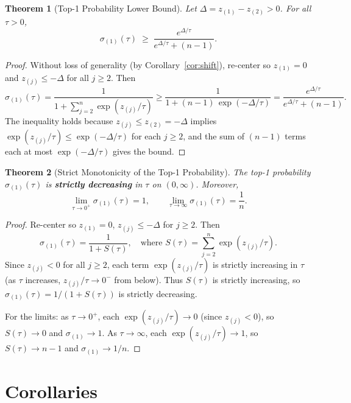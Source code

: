 \documentclass[11pt,a4paper]{article}
\newtheorem{theorem}{Theorem}
\theoremstyle{definition}
\newcommand{\softmax}{\sigma}
\newcommand{\temp}{\tau}
\newcommand{\gap}{\Delta}
\begin{document}
\begin{theorem}[Top-1 Probability Lower Bound]
\label{thm:lower}
Let $\gap = z_{(1)} - z_{(2)} > 0$. For all $\temp > 0$,
\[
  \softmax_{(1)}(\temp) \;\geq\; \frac{e^{\gap / \temp}}{e^{\gap / \temp} + (n - 1)}.
\]
\end{theorem}

\begin{proof}
Without loss of generality (by Corollary~\ref{cor:shift}), re-center so $z_{(1)} = 0$ and $z_{(j)} \leq -\gap$ for all $j \geq 2$. Then
\[
  \softmax_{(1)}(\temp) = \frac{1}{1 + \sum_{j=2}^{n} \exp(z_{(j)} / \temp)}
  \geq \frac{1}{1 + (n-1)\, \exp(-\gap / \temp)}
  = \frac{e^{\gap / \temp}}{e^{\gap / \temp} + (n - 1)}.
\]
The inequality holds because $z_{(j)} \leq z_{(2)} = -\gap$ implies $\exp(z_{(j)}/\temp) \leq \exp(-\gap/\temp)$ for each $j \geq 2$, and the sum of $(n-1)$ terms each at most $\exp(-\gap/\temp)$ gives the bound.
\end{proof}

\begin{theorem}[Strict Monotonicity of the Top-1 Probability]
\label{thm:mono}
The top-1 probability $\softmax_{(1)}(\temp)$ is \textbf{strictly decreasing} in $\temp$ on $(0, \infty)$. Moreover,
\[
  \lim_{\temp \to 0^{+}} \softmax_{(1)}(\temp) = 1,
  \qquad
  \lim_{\temp \to \infty} \softmax_{(1)}(\temp) = \frac{1}{n}.
\]
\end{theorem}

\begin{proof}
Re-center so $z_{(1)} = 0$, $z_{(j)} \leq -\gap$ for $j \geq 2$. Then
\[
  \softmax_{(1)}(\temp) = \frac{1}{1 + S(\temp)}, \quad \text{where } S(\temp) = \sum_{j=2}^{n} \exp(z_{(j)} / \temp).
\]
Since $z_{(j)} < 0$ for all $j \geq 2$, each term $\exp(z_{(j)}/\temp)$ is strictly increasing in $\temp$ (as $\temp$ increases, $z_{(j)}/\temp \to 0^-$ from below). Thus $S(\temp)$ is strictly increasing, so $\softmax_{(1)}(\temp) = 1/(1+S(\temp))$ is strictly decreasing.

For the limits: as $\temp \to 0^+$, each $\exp(z_{(j)}/\temp) \to 0$ (since $z_{(j)} < 0$), so $S(\temp) \to 0$ and $\softmax_{(1)} \to 1$. As $\temp \to \infty$, each $\exp(z_{(j)}/\temp) \to 1$, so $S(\temp) \to n-1$ and $\softmax_{(1)} \to 1/n$.
\end{proof}

\section{Corollaries}
\end{document}
